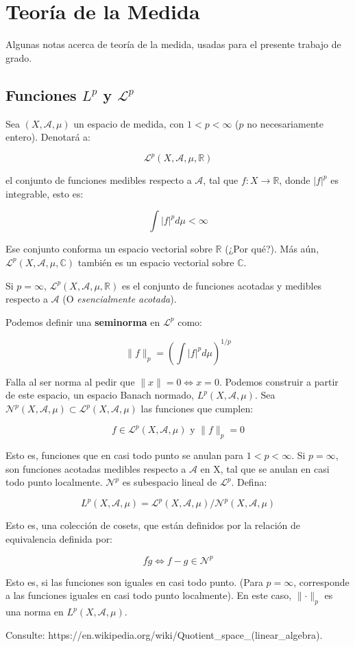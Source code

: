 \section{Teoría de la Medida}

Algunas notas acerca de teoría de la medida, usadas para el presente trabajo de grado.

\subsection{Funciones $L^p$ y $\mathcal{L}^p$}

Sea $(X, \mathcal{A}, \mu)$ un espacio de medida, con $1 < p < \infty$ ($p$ no necesariamente entero). Denotará a:

\[
	\mathcal{L}^p (X, \mathcal{A}, \mu, \mathbb{R})
\]

el conjunto de funciones medibles respecto a $\mathcal{A}$, tal que $f: X \rightarrow \mathbb{R}$, donde $\lvert f \rvert^p$ es integrable, esto es:

\[
	\int \lvert f \rvert^p d\mu < \infty
\]

Ese conjunto conforma un espacio vectorial sobre $\mathbb{R}$ (¿Por qué?). Más aún, $\mathcal{L}^p (X, \mathcal{A}, \mu, \mathbb{C})$ también es un espacio vectorial sobre $\mathbb{C}$.

Si $p = \infty$, $\mathcal{L}^p (X, \mathcal{A}, \mu, \mathbb{R})$ es el conjunto de funciones acotadas y medibles respecto a $\mathcal{A}$ (O \textit{esencialmente acotada}).

Podemos definir una \textbf{seminorma} en $\mathcal{L}^p$ como:

\[
	\lVert f \rVert_p = \left( \int \lvert f \rvert^p d\mu \right)^{1/p}
\]

Falla al ser norma al pedir que $\lVert x \rVert = 0 \Leftrightarrow x = 0$. Podemos construir a partir de este espacio, un espacio Banach normado, $L^p (X, \mathcal{A}, \mu)$. Sea $\mathcal{N}^p (X, \mathcal{A}, \mu) \subset \mathcal{L}^p (X, \mathcal{A}, \mu)$ las funciones que cumplen:

\[
	f \in \mathcal{L}^p (X, \mathcal{A}, \mu) \text{ y } \lVert f \rVert_p = 0
\] 

Esto es, funciones que en casi todo punto se anulan para $1 < p < \infty$. Si $p = \infty$, son funciones acotadas medibles respecto a $\mathcal{A}$ en X, tal que se anulan en casi todo punto localmente. $\mathcal{N}^p$ es subespacio lineal de $\mathcal{L}^p$. Defina:

\[
	L^p (X, \mathcal{A}, \mu) = \mathcal{L}^p (X, \mathcal{A}, \mu) / \mathcal{N}^p (X, \mathcal{A}, \mu)
\]

Esto es, una colección de cosets, que están definidos por la relación de equivalencia definida por:

\[
	f \tilde g \Leftrightarrow f - g \in \mathcal{N}^p
\]

Esto es, si las funciones son iguales en casi todo punto. (Para $p = \infty$, corresponde a las funciones iguales en casi todo punto localmente). En este caso, $\lVert \cdot \rVert_p$ es una norma en $L^p (X, \mathcal{A}, \mu)$.

Consulte: https://en.wikipedia.org/wiki/Quotient\_space\_(linear\_algebra).